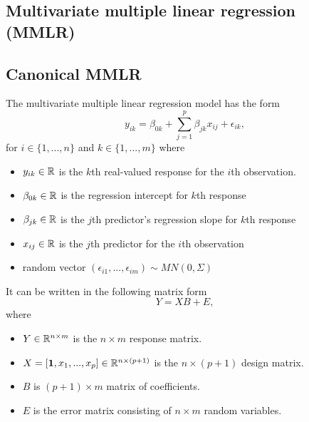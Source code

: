 \begin{refsection}
\section{Multivariate multiple linear regression (MMLR)}


\subsection{Canonical MMLR}
\begin{definition}
The multivariate multiple linear regression model has the form
$$y_{ik} = \beta_{0k} + \sum_{j=1}^p \beta_{jk}x_{ij} + \epsilon_{ik},$$
for $i\in \{1,...,n\}$ and $k\in \{1,...,m\}$ where
\begin{itemize}
	\item $y_{ik}\in \mathbb{R}$ is the $k$th real-valued response for the $i$th observation.
	\item $\beta_{0k}\in \mathbb{R}$ is the regression intercept for $k$th response
	\item $\beta_{jk}\in \mathbb{R}$ is the $j$th predictor's regression slope for $k$th response
	\item $x_{ij}\in \mathbb{R}$ is the $j$th predictor for the $i$th observation
	\item random vector $(\epsilon_{i1},...,\epsilon_{im})\sim MN(0,\Sigma)$ 
\end{itemize}	

It can be written in the following matrix form
$$Y = XB + E,$$
where 
\begin{itemize}
	\item $Y\in \mathbb{R}^{n\times m}$ is the $n\times m$ response matrix. 
	\item $X = [\bm{1}, x_1,...,x_p] \in \mathbb{R}^{n\times (p+1)}$ is the $n\times (p+1)$ design matrix.
	\item $B$ is $(p+1)\times m$ matrix of coefficients.
	\item $E$ is the error matrix consisting of $n\times m$ random variables. 
\end{itemize}


\end{definition}
\end{refsection}
